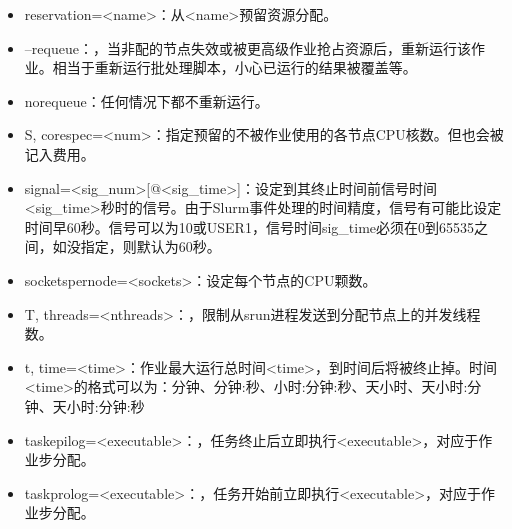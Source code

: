 \documentclass[a4paper,12pt,english]{sphinxmanual}
\begin{document}
\begin{itemize}
\item {} 
\sphinxAtStartPar
\sphinxhyphen{}\sphinxhyphen{}reservation=<name>：从<name>预留资源分配。

\item {} 
\sphinxAtStartPar
–requeue：，当非配的节点失效或被更高级作业抢占资源后，重新运行该作业。相当于重新运行批处理脚本，小心已运行的结果被覆盖等。

\item {} 
\sphinxAtStartPar
\sphinxhyphen{}\sphinxhyphen{}no\sphinxhyphen{}requeue：任何情况下都不重新运行。

\item {} 
\sphinxAtStartPar
\sphinxhyphen{}S, \sphinxhyphen{}\sphinxhyphen{}core\sphinxhyphen{}spec=<num>：指定预留的不被作业使用的各节点CPU核数。但也会被记入费用。

\item {} 
\sphinxAtStartPar
\sphinxhyphen{}\sphinxhyphen{}signal=<sig\_num>{[}@<sig\_time>{]}：设定到其终止时间前信号时间<sig\_time>秒时的信号。由于Slurm事件处理的时间精度，信号有可能比设定时间早60秒。信号可以为10或USER1，信号时间sig\_time必须在0到65535之间，如没指定，则默认为60秒。

\item {} 
\sphinxAtStartPar
\sphinxhyphen{}\sphinxhyphen{}sockets\sphinxhyphen{}per\sphinxhyphen{}node=<sockets>：设定每个节点的CPU颗数。

\item {} 
\sphinxAtStartPar
\sphinxhyphen{}T, \sphinxhyphen{}\sphinxhyphen{}threads=<nthreads>：，限制从srun进程发送到分配节点上的并发线程数。

\item {} 
\sphinxAtStartPar
\sphinxhyphen{}t, \sphinxhyphen{}\sphinxhyphen{}time=<time>：作业最大运行总时间<time>，到时间后将被终止掉。时间<time>的格式可以为：分钟、分钟:秒、小时:分钟:秒、天\sphinxhyphen{}小时、天\sphinxhyphen{}小时:分钟、天\sphinxhyphen{}小时:分钟:秒

\item {} 
\sphinxAtStartPar
\sphinxhyphen{}\sphinxhyphen{}task\sphinxhyphen{}epilog=<executable>：，任务终止后立即执行<executable>，对应于作业步分配。

\item {} 
\sphinxAtStartPar
\sphinxhyphen{}\sphinxhyphen{}task\sphinxhyphen{}prolog=<executable>：，任务开始前立即执行<executable>，对应于作业步分配。


\end{itemize}
\end{document}
